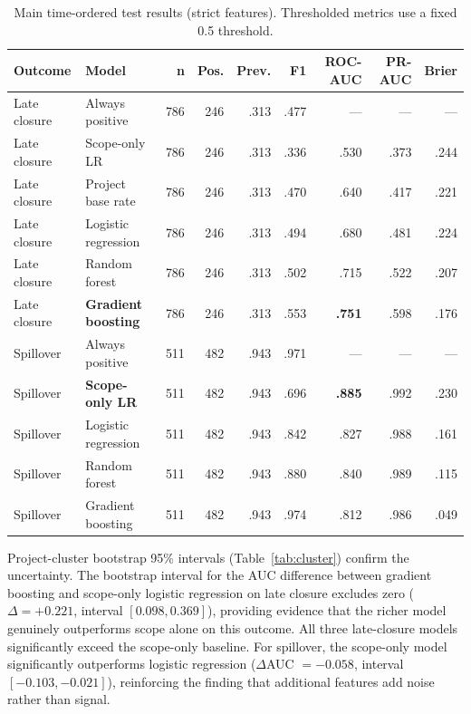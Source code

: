 \documentclass[conference]{IEEEtran}
\begin{document}
\begin{table}[t]
\centering\scriptsize
\caption{Main time-ordered test results (strict features). Thresholded metrics use a fixed 0.5 threshold.}
\label{tab:main}
\setlength{\tabcolsep}{3.0pt}
\begin{tabular}{@{}llrrrrrrr@{}}
\toprule
Outcome & Model & n & Pos. & Prev. & F1 & ROC-AUC & PR-AUC & Brier\\
\midrule
Late closure & Always positive & 786 & 246 & .313 & .477 & --- & --- & ---\\
Late closure & Scope-only LR & 786 & 246 & .313 & .336 & .530 & .373 & .244\\
Late closure & Project base rate & 786 & 246 & .313 & .470 & .640 & .417 & .221\\
Late closure & Logistic regression & 786 & 246 & .313 & .494 & .680 & .481 & .224\\
Late closure & Random forest & 786 & 246 & .313 & .502 & .715 & .522 & .207\\
Late closure & \textbf{Gradient boosting} & 786 & 246 & .313 & .553 & \textbf{.751} & .598 & .176\\
\midrule
Spillover & Always positive & 511 & 482 & .943 & .971 & --- & --- & ---\\
Spillover & \textbf{Scope-only LR} & 511 & 482 & .943 & .696 & \textbf{.885} & .992 & .230\\
Spillover & Logistic regression & 511 & 482 & .943 & .842 & .827 & .988 & .161\\
Spillover & Random forest & 511 & 482 & .943 & .880 & .840 & .989 & .115\\
Spillover & Gradient boosting & 511 & 482 & .943 & .974 & .812 & .986 & .049\\
\bottomrule
\end{tabular}
\end{table}

Project-cluster bootstrap 95\% intervals (Table~\ref{tab:cluster}) confirm the uncertainty.
The bootstrap interval for the AUC difference between gradient boosting and scope-only logistic regression on late closure excludes zero ($\Delta = +0.221$, interval $[0.098, 0.369]$), providing evidence that the richer model genuinely outperforms scope alone on this outcome.
All three late-closure models significantly exceed the scope-only baseline.
For spillover, the scope-only model significantly outperforms logistic regression ($\Delta$AUC $= -0.058$, interval $[-0.103, -0.021]$), reinforcing the finding that additional features add noise rather than signal.
\end{document}
